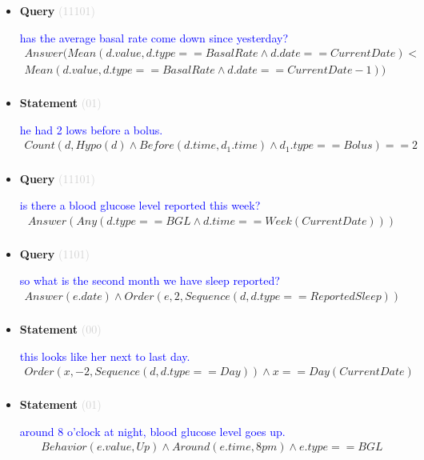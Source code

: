 \documentclass[11pt]{article}
\newcommand{\key}[1]{\textcolor{lightgray}{#1}}
\newcounter{CQuery}
\newcounter{CStatement}
\begin{document}
\begin{itemize}
\item
\textbf{Query\theCQuery} \key{(11101)} \addtocounter{CQuery}{1}
\textcolor{blue}{ has the average basal rate come down since yesterday? }
\begin{multline*}
Answer(Mean(d.value, d.type==BasalRate \wedge d.date==CurrentDate) < \\ 
Mean(d.value, d.type==BasalRate \wedge d.date==CurrentDate-1)) \\ 
\end{multline*}


\item
\textbf{Statement\theCStatement} \key{(01)} \addtocounter{CStatement}{1}
\textcolor{blue}{ he had 2 lows before a bolus. }
\begin{multline*}
Count(d, Hypo(d) \wedge Before(d.time, d_1.time) \wedge d_1.type==Bolus)==2 \\ 
\end{multline*}


\item
\textbf{Query\theCQuery} \key{(11101)} \addtocounter{CQuery}{1}
\textcolor{blue}{ is there a blood glucose level reported this week? }
\begin{multline*}
Answer(Any(d.type==BGL \wedge d.time==Week(CurrentDate))) \\ 
\end{multline*}


\item
\textbf{Query\theCQuery} \key{(1101)} \addtocounter{CQuery}{1}
\textcolor{blue}{ so what is the second month we have sleep reported? }
\begin{multline*}
Answer(e.date) \wedge Order(e, 2, Sequence(d, d.type==ReportedSleep)) \\ 
\end{multline*}


\item
\textbf{Statement\theCStatement} \key{(00)} \addtocounter{CStatement}{1}
\textcolor{blue}{ this looks like her next to last day. }
\begin{multline*}
Order(x, -2, Sequence(d, d.type==Day)) \wedge x==Day(CurrentDate) \\ 
\end{multline*}


\item
\textbf{Statement\theCStatement} \key{(01)} \addtocounter{CStatement}{1}
\textcolor{blue}{ around 8 o'clock at night, blood glucose level goes up. }
\begin{multline*}
Behavior(e.value, Up) \wedge Around(e.time, 8pm) \wedge e.type==BGL \\ 
\end{multline*}



\end{itemize}
\end{document}

